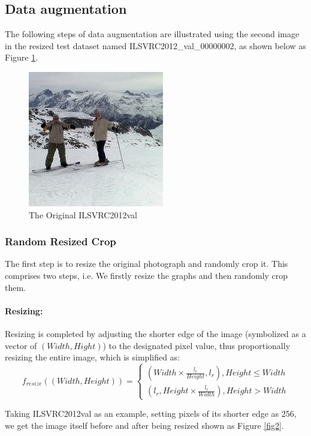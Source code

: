 \documentclass{article}
\begin{document}
\subsection{Data augmentation}
The following steps of data augmentation are illustrated using the second image in the resized test dataset named ILSVRC2012\_val\_00000002, as shown below as Figure \ref{fig1}.

\begin{figure}[htbp]
\centerline{\includegraphics[scale=0.6]{ILSVRC2012_val_00000002.JPEG}}
\caption{The Original ILSVRC2012\textunderscore val }
\label{fig1}
\end{figure}
 

\subsubsection{Random Resized Crop}
The first step is to resize the original photograph and randomly crop it. This comprises two steps, i.e. We firstly resize the graphs and then randomly crop them.

\paragraph{Resizing:}
Resizing is completed by adjusting the shorter edge of the image (symbolized as a vector of $(Width,Hight)$) to the designated pixel value, thus proportionally resizing the entire image, which is simplified as: 
\begin{equation}
f_{resize}((Width,Height))=\begin{cases}
(Width\times \frac{l_r}{Height},l_r), Height\leqslant Width\\
(l_r,Height\times \frac{l_r}{Width}), Height>Width
\end{cases}
\end{equation}
 
Taking ILSVRC2012\textunderscore val  as an example, setting pixels of its shorter edge as 256, we get the image itself before and after being resized shown as Figure \ref{fig2}.
\end{document}
